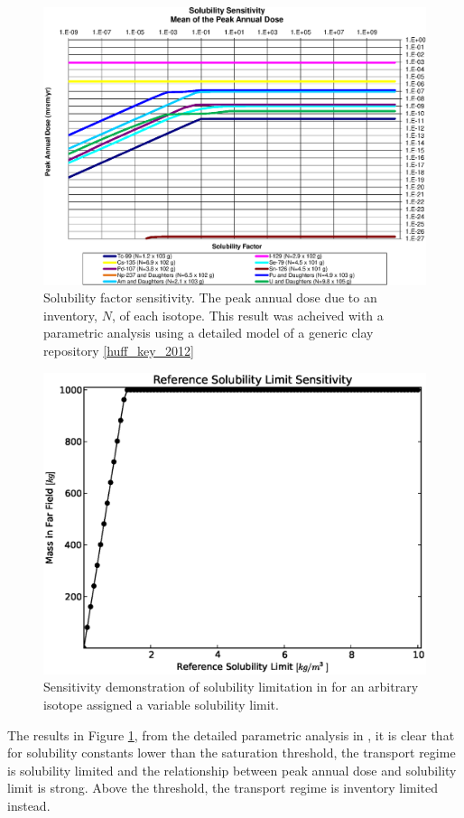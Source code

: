 \begin{figure}[ht]
\begin{center}
\includegraphics[width=0.7\linewidth]{./results/images/Solubility_Summary_SolFactor.eps}
\caption[Solubility factor sensitivity in GDSM Clay model]{Solubility factor sensitivity. The peak annual dose due to an inventory, $N$, of each isotope. This result was acheived with a parametric analysis using a detailed model of a generic clay repository \ref{huff_key_2012}}
\label{fig:SolSumFactor}
\end{center}
\end{figure}

\begin{figure}[ht]
\begin{center}
\includegraphics[width=0.7\linewidth]{./results/images/sol.eps}
\caption[Solubility Sensitivity in the Mixed Cell Model]{Sensitivity demonstration of solubility limitation in \Cyder for an arbitrary isotope assigned a variable solubility limit.}
\label{fig:sol_result}
\end{center}
\end{figure}


The results in Figure \ref{fig:SolSumFactor}, from the detailed parametric
analysis in \cite{huff_key_2012}, it is clear that for
solubility constants lower than the saturation threshold, the transport regime is solubility
limited and the relationship between peak annual dose and solubility limit is
strong.  Above the threshold, the transport regime is inventory limited
instead.

